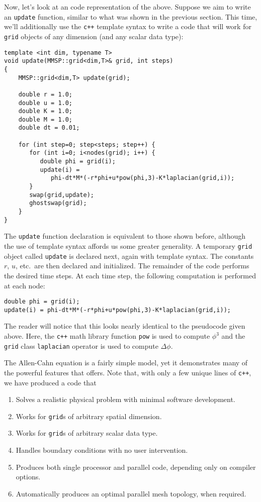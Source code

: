 Now, let's look at an \MMSP code representation of the above.  Suppose we aim to write an {\tt update} function, similar to what was shown in the previous section.  This time, we'll additionally use the {\tt c++} template syntax to write a code that will work for {\tt grid} objects of any dimension (and any scalar data type):
\begin{shadebox}
\begin{verbatim}
template <int dim, typename T>
void update(MMSP::grid<dim,T>& grid, int steps)
{
    MMSP::grid<dim,T> update(grid);

    double r = 1.0;
    double u = 1.0;
    double K = 1.0;
    double M = 1.0;
    double dt = 0.01;

    for (int step=0; step<steps; step++) {
       for (int i=0; i<nodes(grid); i++) {
          double phi = grid(i);
          update(i) =
             phi-dt*M*(-r*phi+u*pow(phi,3)-K*laplacian(grid,i));
       }
       swap(grid,update);
       ghostswap(grid);
    }
}
\end{verbatim}
\end{shadebox}
The {\tt update} function declaration is equivalent to those shown before, although the use of template syntax affords us some greater generality.  A temporary {\tt grid} object called {\tt update} is declared next, again with template syntax.  The constants $r$, $u$, etc.\ are then declared and initialized.  The remainder of the code performs the desired time steps.  At each time step, the following computation is performed at each node:
\begin{shadebox}
\begin{verbatim}
double phi = grid(i);
update(i) = phi-dt*M*(-r*phi+u*pow(phi,3)-K*laplacian(grid,i));
\end{verbatim}
\end{shadebox}
The reader will notice that this looks nearly identical to the pseudocode given above.  Here, the {\tt c++} math library function {\tt pow} is used to compute $\phi^3$ and the {\tt grid} class {\tt laplacian} operator is used to compute $\Delta \phi$.

The Allen-Cahn equation is a fairly simple model, yet it demonstrates many of the powerful features that \MMSP offers.  Note that, with only a few unique lines of {\tt c++}, we have produced a code that
\begin{enumerate}
\item{Solves a realistic physical problem with minimal software development.}
\item{Works for {\tt grid}s of arbitrary spatial dimension.}
\item{Works for {\tt grid}s of arbitrary scalar data type.}
\item{Handles boundary conditions with no user intervention.}
\item{Produces both single processor and parallel code, depending only on compiler options.}
\item{Automatically produces an optimal parallel mesh topology, when required.}
\end{enumerate}


